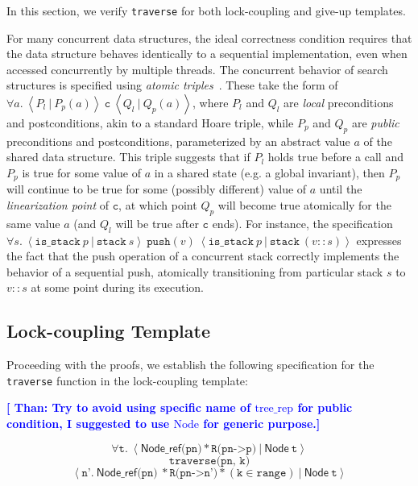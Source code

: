 \documentclass[a4paper,UKenglish,cleveref, autoref, thm-restate]{lipics-v2021}
\newcommand{\treerep}{\ensuremath{\mathsf{Node}}}
\newcommand{\nodeboxrep}{\ensuremath{\mathsf{Node\_ref}}}
\newcommand{\lockinv}{\ensuremath{\mathsf{lock\_inv}}}
\newcommand{\than}[1]{\textbf{\textcolor{blue}{[ Than: #1]}}}
\begin{document}
In this section, we verify \lstinline{traverse} for both lock-coupling and give-up templates.  

For many concurrent data structures, the ideal correctness condition requires that the data structure behaves identically to a sequential implementation, even when accessed concurrently by multiple threads. The concurrent behavior of search structures is specified using \emph{atomic triples}~\cite{tada}. These take the form of $\forall a.\ \left\langle P_l\ |\ P_p(a) \right\rangle\ \texttt{c}\ \left\langle Q_l\ |\ Q_p(a)\right\rangle$, where $P_l$ and $Q_l$ are \emph{local} preconditions and postconditions, akin to a standard Hoare triple, while $P_p$ and $Q_p$ are \emph{public} preconditions and postconditions, parameterized by an abstract value $a$ of the shared data structure. This triple suggests that if $P_l$ holds true before a call and $P_p$ is true for some value of $a$ in a shared state (e.g. a global invariant), then $P_p$ will continue to be true for some (possibly different) value of $a$ until the \emph{linearization point} of $\texttt{c}$, at which point $Q_p$ will become true atomically for the same value $a$ (and $Q_l$ will be true after $\texttt{c}$ ends). For instance, the specification
$\forall s.\ \left\langle \texttt{is\_stack}\ p\ |\ \texttt{stack}\ s\right\rangle\ \texttt{push}(v)\ \left\langle \texttt{is\_stack}\ p\ |\ \texttt{stack}\ (v::s)\right\rangle$
expresses the fact that the push operation of a concurrent stack correctly implements the behavior of a sequential push, atomically transitioning from particular stack $s$ to $v::s$ at some point during its execution.

\subsection{Lock-coupling Template}
Proceeding with the proofs, we establish the following specification for the \lstinline{traverse} function in the lock-coupling template:

\than{Try to avoid using specific name of $\mathrm{tree\_rep}$ for public condition, I suggested to use $\mathrm{Node}$ for generic purpose.} 


$$\forall \texttt{t}.\ \left\langle \nodeboxrep \texttt{(pn)} 
\ast \texttt{R(pn->p)} \ | \ \treerep\ \texttt{t} \right\rangle $$
$$\texttt{traverse(pn, k)}$$
$$\left\langle \texttt{n'}.\ \nodeboxrep \texttt{(pn)} \
\ast \texttt{R(pn->n')} \ast (\texttt{k} \in \texttt{range})
\ |\ \treerep\ \texttt{t} \right\rangle$$
\end{document}

